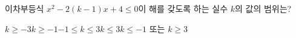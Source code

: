 이차부등식 $x^2-2(k-1)x+4\le 0$이 해를 갖도록 하는 실수 $k$의 값의 범위는?
\begin{choices32}{$k\ge -3$}{$k\ge -1$}{$-1\le k\le 3$}{$k\le 3$}{$k\le -1$ 또는 $k\ge 3$}\end{choices32}
